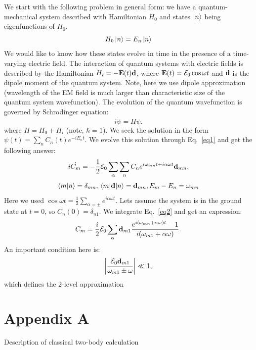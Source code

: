 \documentclass[twocolumn,superscriptaddress,unsortedaddress,
 amsmath,amssymb,
 aps,
]{revtex4-2}
\begin{document}
We start with the following problem in general form: we have a quantum-mechanical system described with Hamiltonian $H_0$ and states $\ket{n}$ being eigenfunctions of $H_0$.
\begin{equation*}
H_0 \ket{n} = E_n \ket{n}
\end{equation*}
We would like to know how these states evolve in time in the presence of a time-varying electric field. The interaction of quantum systems with electric fields is described by the Hamiltonian $ H_i = - \vb{E}(t) \vb{d}$, where $\vb{E}(t) = \vb{\mathcal{E}}_0 \cos \omega t$ and $\vb{d}$ is the dipole moment of the quantum system. Note, here we use dipole approximation (wavelength of the EM field is much larger than characteristic size of the quantum system wavefunction). The evolution of the quantum wavefunction is governed by Schrodinger equation:
\begin{equation}
 i \dot{\psi} = H \psi
\label{eq1}.
\end{equation}
where $H = H_0 + H_i$ (note, $\hbar = 1$). We seek the solution in the form $\psi(t) = \sum_n C_n(t) e^{-i E_n t}$. We evolve this solution through Eq.~\ref{eq1} and get the following answer:
\begin{equation}
 i \dot{C_m} = -\frac{1}{2} \vb{\mathcal{E}}_0 \sum_{\alpha} \sum_{n} C_n e^{i \omega_{mn} t + i \alpha \omega t} \vb{d}_{mn}
\label{eq2},
\end{equation}
\begin{equation}
 \braket{m}{n} = \delta_{mn}, \mel{m}{\vb{d}}{n} = \vb{d}_{mn}, E_m - E_n = \omega_{mn}
\end{equation}
Here we used $\cos \omega t = \frac{1}{2} \sum_{\alpha = \pm} e^{i \alpha \omega t}$. Lets assume the system is in the ground state at $t = 0$, so $C_n(0) = \delta_{n1}$. We integrate Eq.~\ref{eq2} and get an expression:
\begin{equation}
 C_m = \frac{i}{2} \vb{\mathcal{E}}_0 \sum_{\alpha} \vb{d}_{m1} \frac{e^{i (\omega_{mn} + \alpha \omega) t} - 1}{i (\omega_{m1} + \alpha \omega)} 
\label{eq3}.
\end{equation}
An important condition here is:
\begin{equation}
\abs{\frac{\vb{\mathcal{E}}_0 \vb{d}_{m1}}{\omega_{m1} \pm \omega}} \ll 1
\label{eq4},
\end{equation}
which defines the 2-level approximation

\section{Appendix A}
Description of classical two-body calculation
\end{document}
